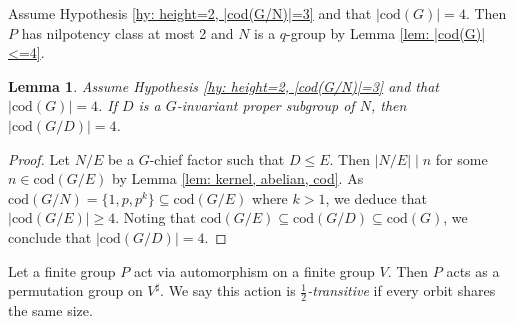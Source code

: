 \documentclass[9pt]{article}
\newtheorem{lem}{\bf Lemma}[section]
\begin{document}
Assume Hypothesis \ref{hy: height=2, |cod(G/N)|=3} and that $|\mathrm{cod}(G)|=4$.
Then $P$ has nilpotency class at most 2 and $N$ is a $q$-group by Lemma \ref{lem: |cod(G)|<=4}.


\begin{lem}\label{lem: height=2, |cod(G/N)|=3, forinduction}
   Assume Hypothesis \ref{hy: height=2, |cod(G/N)|=3}
   and that $|\mathrm{cod}(G)|=4$. 
   If $D$ is a $G$-invariant proper subgroup of $N$,
	 then $|\mathrm{cod}(G/D)|=4$.
\end{lem}
\begin{proof}
    Let $N/E$ be a $G$-chief factor such that $D\leq E$.
   Then $|N/E|\mid n$ for some $n\in \mathrm{cod}(G/E)$ by Lemma \ref{lem: kernel, abelian, cod}. 
   As $\mathrm{cod}(G/N)=\{ 1,p,p^{k} \}\subseteq \mathrm{cod}(G/E)$ where $k>1$,
   we deduce that $|\mathrm{cod}(G/E)|\geq 4$.
   Noting that $\mathrm{cod}(G/E)\subseteq \mathrm{cod}(G/D)\subseteq \mathrm{cod}(G)$,
   we conclude that $|\mathrm{cod}(G/D)|=4$.
\end{proof}



Let a finite group $P$ act via automorphism on a finite group $V$.
Then $P$ acts as a permutation group on $V^\sharp$.
We say this action is \emph{$\frac{1}{2}$-transitive} if every orbit shares the same size.
\end{document}

